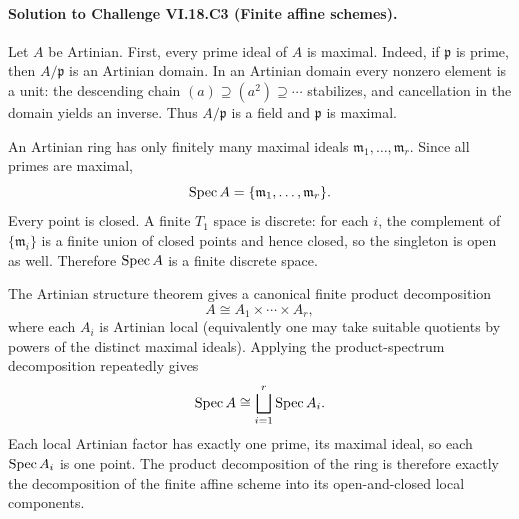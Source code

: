 \paragraph{Solution to Challenge VI.18.C3 (Finite affine schemes).}
\begin{solution}
Let $A$ be Artinian. First, every prime ideal of $A$ is maximal. Indeed, if $\mathfrak p$ is prime, then $A/\mathfrak p$ is an Artinian domain. In an Artinian domain every nonzero element is a unit: the descending chain $(a)\supseteq(a^2)\supseteq\cdots$ stabilizes, and cancellation in the domain yields an inverse. Thus $A/\mathfrak p$ is a field and $\mathfrak p$ is maximal.

An Artinian ring has only finitely many maximal ideals $\mathfrak m_1,\dots,\mathfrak m_r$. Since all primes are maximal,
\[
\operatorname{Spec} A=\{\mathfrak m_1,\dots,\mathfrak m_r\}.
\]
Every point is closed. A finite $T_1$ space is discrete: for each $i$, the complement of $\{\mathfrak m_i\}$ is a finite union of closed points and hence closed, so the singleton is open as well. Therefore $\operatorname{Spec} A$ is a finite discrete space.

The Artinian structure theorem gives a canonical finite product decomposition
\[
A\cong A_1\times\cdots\times A_r,
\]
where each $A_i$ is Artinian local (equivalently one may take suitable quotients by powers of the distinct maximal ideals). Applying the product-spectrum decomposition repeatedly gives
\[
\operatorname{Spec} A\cong\bigsqcup_{i=1}^r\operatorname{Spec} A_i.
\]
Each local Artinian factor has exactly one prime, its maximal ideal, so each $\operatorname{Spec} A_i$ is one point. The product decomposition of the ring is therefore exactly the decomposition of the finite affine scheme into its open-and-closed local components.
\end{solution}

